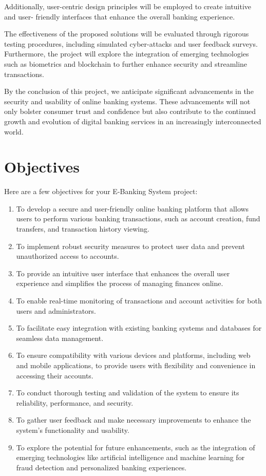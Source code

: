 \documentclass[12pt,a4paper]{report}
\begin{document}
Additionally, user-centric design principles will be employed to create intuitive and user-
friendly interfaces that enhance the overall banking experience.

The effectiveness of the proposed solutions will be evaluated through rigorous testing
procedures, including simulated cyber-attacks and user feedback surveys. Furthermore, the
project will explore the integration of emerging technologies such as biometrics and
blockchain to further enhance security and streamline transactions.

By the conclusion of this project, we anticipate significant advancements in the security and
usability of online banking systems. These advancements will not only bolster consumer
trust and confidence but also contribute to the continued growth and evolution of digital
banking services in an increasingly interconnected world.

\chapter{Objectives}

Here are a few objectives for your E-Banking System project:
\begin{enumerate}
    \item To develop a secure and user-friendly online banking platform that allows users to
    perform various banking transactions, such as account creation, fund transfers, and
    transaction history viewing.
    \item To implement robust security measures to protect user data and prevent unauthorized
    access to accounts.
    \item To provide an intuitive user interface that enhances the overall user experience and
    simplifies the process of managing finances online.
    \item To enable real-time monitoring of transactions and account activities for both users
    and administrators.
    \item To facilitate easy integration with existing banking systems and databases for
    seamless data management.
    \item To ensure compatibility with various devices and platforms, including web and
    mobile applications, to provide users with flexibility and convenience in accessing their
    accounts.
    \item To conduct thorough testing and validation of the system to ensure its reliability,
    performance, and security.
    \item To gather user feedback and make necessary improvements to enhance the system's
    functionality and usability.
    \item To explore the potential for future enhancements, such as the integration of
    emerging technologies like artificial intelligence and machine learning for fraud detection
    and personalized banking experiences.
\end{enumerate}
\end{document}
